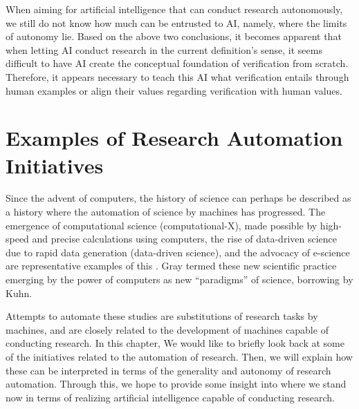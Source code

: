 \documentclass{article}
\begin{document}
When aiming for artificial intelligence that can conduct research autonomously, we still do not know how much can be entrusted to AI, namely, where the limits of autonomy lie. Based on the above two conclusions, it becomes apparent that when letting AI conduct research in the current definition's sense, it seems difficult to have AI create the conceptual foundation of verification from scratch. Therefore, it appears necessary to teach this AI what verification entails through human examples or align their values regarding verification with human values.

\section{Examples of Research Automation Initiatives}
\label{chapter-literature-review}
Since the advent of computers, the history of science can perhaps be described as a history where the automation of science by machines has progressed. The emergence of computational science (computational-X), made possible by high-speed and precise calculations using computers, the rise of data-driven science due to rapid data generation (data-driven science), and the advocacy of e-science are representative examples of this \cite{hey2009fourth}. Gray termed these new scientific practice emerging by the power of computers as new ``paradigms'' of science, borrowing by Kuhn.

Attempts to automate these studies are substitutions of research tasks by machines, and are closely related to the development of machines capable of conducting research. In this chapter, We would like to briefly look back at some of the initiatives related to the automation of research. Then, we will explain how these can be interpreted in terms of the generality and autonomy of research automation. Through this, we hope to provide some insight into where we stand now in terms of realizing artificial intelligence capable of conducting research.
\end{document}
